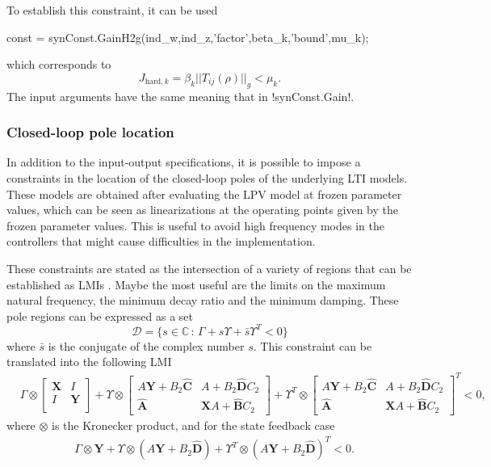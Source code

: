 \documentclass[fleqn,11pt]{article}
\newcommand{\p}{\rho}
\newcommand{\Cset}{\mathbb{C}}
\newcommand{\Xu}{\mathbf{X}}
\newcommand{\Yu}{\mathbf{Y}}
\newcommand{\Au}{\mathbf{\hat A}}
\newcommand{\Bu}{\mathbf{\hat B}}
\newcommand{\Cu}{\mathbf{\hat C}}
\newcommand{\Du}{\mathbf{\hat D}}
\begin{document}
To establish this constraint, it can be used
\begin{code}
const = synConst.GainH2g(ind_w,ind_z,'factor',beta_k,'bound',mu_k);
\end{code}
which corresponds to
\begin{equation*}
    J_{\mathrm{hard},k} = \beta_k ||T_{ij}(\p)||_g < \mu_k.
\end{equation*}
The input arguments have the same meaning that in !synConst.Gain!.


\subsubsection{Closed-loop pole location}\label{sssec:constPoles}

In addition to the input-output specifications, it is possible to impose a constraints in the location of the closed-loop poles of the underlying LTI models. These models are obtained after evaluating the LPV model at frozen parameter values, which can be seen as linearizations at the operating points given by the frozen parameter values. This is useful to avoid high frequency modes in the controllers that might cause difficulties in the implementation.

These constraints are stated as the intersection of a variety of regions that can be established as LMIs \cite{chilali_h_infty_1996}. Maybe the most useful are the limits on the maximum natural frequency, the minimum decay ratio and the minimum damping. These pole regions can be expressed as a set
\begin{equation*}
    \mathcal{D} = \{s\in\Cset\,:\,\Gamma+s\Upsilon+\bar{s}\Upsilon^T<0\}
\end{equation*}
where $\bar{s}$ is the conjugate of the complex number $s$. This constraint can be translated into the following LMI
\begin{align*}
    &\Gamma\otimes
    \begin{bmatrix}
        \Xu & I \\
        I & \Yu\\
    \end{bmatrix} +
    \Upsilon\otimes
    \begin{bmatrix}
        A\Yu+B_2\Cu & A+B_2\Du C_2 \\
        \Au & \Xu A+\Bu C_2
    \end{bmatrix} +
    \Upsilon^T\otimes
    \begin{bmatrix}
        A\Yu+B_2\Cu & A+B_2\Du C_2 \\
        \Au & \Xu A+\Bu C_2
    \end{bmatrix}^T<0,
\end{align*}
where $\otimes$ is the Kronecker product, and for the state feedback case
\begin{align*}
    &\Gamma\otimes
    \Yu +
    \Upsilon\otimes(A\Yu+B_2\Du) +
    \Upsilon^T\otimes(A\Yu+B_2\Du)^T<0.
\end{align*}
\end{document}
